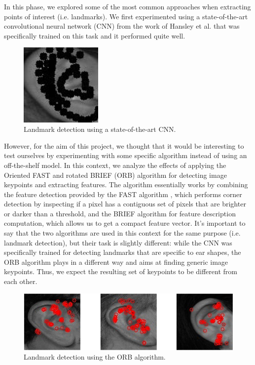 \documentclass{article}
\begin{document}
In this phase, we explored some of the most common approaches when extracting points
of interest (i.e. landmarks). We first experimented using a state-of-the-art convolutional neural network
(CNN) from the work of Hansley et al. that was specifically trained on this task and it performed quite well.

\begin{figure}[h]
    \begin{center}
        \includegraphics[width=4cm,keepaspectratio]{images/landmark.jpeg}
        \caption{Landmark detection using a state-of-the-art CNN.}
    \end{center}
\end{figure}

However, for the aim of this project, we thought that it would be interesting to test ourselves
by experimenting with some specific algorithm instead of using an off-the-shelf model. In this context,
we analyze the effects of applying the Oriented FAST and rotated BRIEF (ORB) algorithm \cite{conf/iccv/RubleeRKB11}
for detecting
image keypoints and extracting features. The algorithm essentially works by combining the feature detection
provided by the FAST algorithm \cite{rosten_2006_machine}, which performs corner detection by inspecting if a pixel
has a contiguous
set of pixels that are brighter or darker than a threshold, and the BRIEF algorithm \cite{Calonder:2010:BBR:1888089.1888148}
for feature description
computation, which allows us to get a compact feature vector. It's important to say that the two
algorithms are used in this context for the same purpose (i.e. landmark detection), but their task is
slightly different: while the CNN was specifically trained for detecting landmarks that are specific to ear
shapes, the ORB algorithm plays in a different way and aims at finding generic image keypoints. Thus,
we expect the resulting set of keypoints to be different from each other.

\begin{figure}[h]
    \begin{center}
        \includegraphics[width=12cm,keepaspectratio]{images/landmark_orb.png}
        \caption{Landmark detection using the ORB algorithm.}
    \end{center}
\end{figure}
\end{document}
